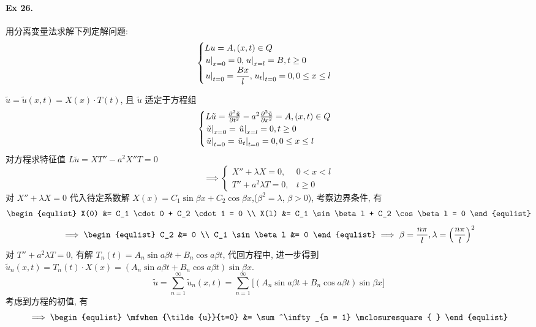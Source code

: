 \paragraph{Ex 26.}
用分离变量法求解下列定解问题:
\[ \begin{cases}
Lu = A, (x, t) \in Q \\
{\left.{u} \right|}_{x=0} = 0, {\left.{u} \right|}_{x=l} = B, t \geq 0 \\
{\left.{u} \right|}_{t=0} = \dfrac{Bx}{l}, {\left.{u_t} \right|}_{t=0} = 0, 0 \leq x \leq l
\end{cases} \]

\begin{solution}
$\tilde{u} = \tilde{u}(x, t) = X(x) \cdot T(t)$, 且 $\tilde{u}$ 适定于方程组
\[ \begin{cases}
L\tilde{u} = {\frac{\partial {^2\tilde{u}}}{\partial {t^2}}} - a^2 {\frac{\partial {^2\tilde{u}}}{\partial {x^2}}}
 = A, (x, t) \in Q \\
{\left.{\tilde{u}} \right|}_{x=0} = {\left.{\tilde{u}} \right|}_{x=l} = 0, t \geq 0 \\
{\left.{\tilde{u}} \right|}_{t=0} = {\left.{\tilde{u}_t} \right|}_{t=0} = 0, 0 \leq x \leq l
\end{cases} \]
对方程求特征值 $L\tilde{u} = XT'' - a^2 X''T = 0$
\[ \implies \begin{cases}
    X'' + \lambda X = 0, & 0 < x < l \\
    T'' + a^2 \lambda T = 0, & t \geq 0
\end{cases} \]
对 $X'' + \lambda X = 0$ 代入待定系数解
$X(x) = C_1 \sin \beta x + C_2 \cos \beta x$,($\beta^2 = \lambda$, $\beta > 0$),
考察边界条件, 有
\[ \begin{equlist}
    X(0) &= C_1 \cdot 0 + C_2 \cdot 1 = 0 \\
    X(l) &= C_1 \sin \beta l + C_2 \cos \beta l = 0
\end{equlist} \]
\[ \implies \begin{equlist}
    C_2 &= 0 \\
    C_1 \sin \beta l &= 0
\end{equlist} \implies
\beta = \frac{n\pi}{l}, \lambda = \mclosure{\frac{n\pi}{l}}^2
\]
对 $T'' + a^2 \lambda T = 0$, 有解 $T_n(t) =A_n\sin a\beta t +B_n\cos a\beta t$,
代回方程中, 进一步得到
$\tilde{u}_n(x, t) = T_n(t)\cdot X(x)
= (A_n \sin a \beta t + B_n \cos a \beta t) \sin\beta x$.
\[
\tilde{u} = \sum^\infty_{n = 1} \tilde{u}_n(x, t)
= \sum^\infty_{n = 1} \bigl[
     (A_n \sin a \beta t + B_n \cos a \beta t) \sin\beta x
\bigr]
\]
考虑到方程的初值, 有
\[ \implies \begin{equlist}
\mfwhen{\tilde{u}}{t=0} &= \sum^\infty_{n = 1} \mclosuresquare{
}
\end{equlist}\]
\end{solution}
